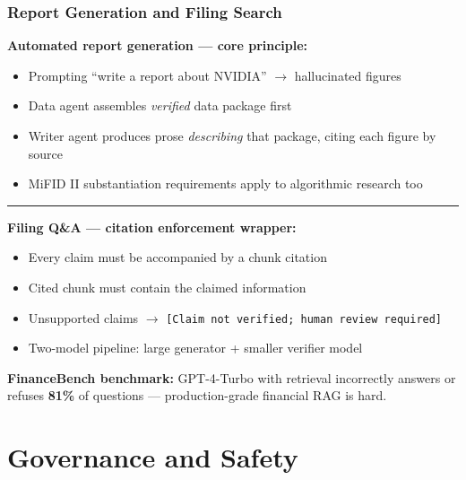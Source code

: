 \documentclass[9pt,t]{beamer}
\begin{document}
\begin{frame}
\frametitle{Report Generation and Filing Search}

\textbf{Automated report generation --- core principle:}
\begin{itemize}
  \item Prompting ``write a report about NVIDIA'' $\to$ hallucinated figures
  \item Data agent assembles \emph{verified} data package first
  \item Writer agent produces prose \emph{describing} that package, citing each figure by source
  \item MiFID II substantiation requirements apply to algorithmic research too
\end{itemize}

\medskip
\rule{\textwidth}{0.4pt}

\textbf{Filing Q\&A --- citation enforcement wrapper:}
\begin{itemize}
  \item Every claim must be accompanied by a chunk citation
  \item Cited chunk must contain the claimed information
  \item Unsupported claims $\to$ \texttt{[Claim not verified; human review required]}
  \item Two-model pipeline: large generator + smaller verifier model
\end{itemize}

\medskip
\textbf{FinanceBench benchmark:} GPT-4-Turbo with retrieval incorrectly answers
or refuses \textbf{81\%} of questions --- production-grade financial RAG is hard.
\end{frame}

\section{Governance and Safety}
\end{document}
